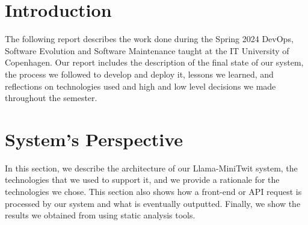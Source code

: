 \documentclass{article}
\begin{document}
\section{Introduction}
The following report describes the work done during the Spring 2024 DevOps, Software Evolution and Software Maintenance taught at the IT University of Copenhagen. Our report includes the description of the final state of our system, the process we followed to develop and deploy it, lessons we learned, and reflections on technologies used and high and low level decisions we made throughout the semester.

\section{System's Perspective}
In this section, we describe the architecture of our Llama-MiniTwit system, the technologies that we used to support it, and we provide a rationale for the technologies we chose. This section also shows how a front-end or API request is processed by our system and what is eventually outputted. Finally, we show the results we obtained from using static analysis tools.
\end{document}
